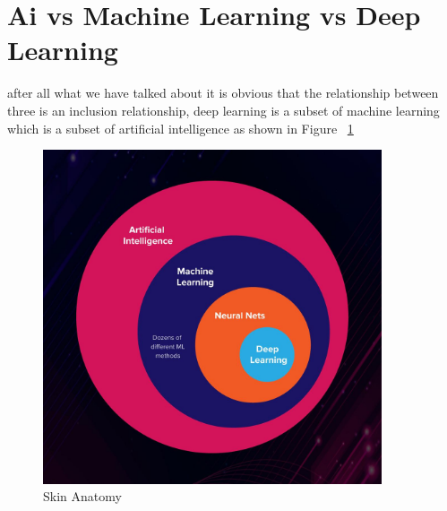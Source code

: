 \section{Ai vs Machine Learning vs Deep Learning}
    after all what we have talked about it is obvious that the relationship between three is an inclusion relationship, deep learning is a subset of machine learning which is a subset of artificial intelligence as shown in Figure ~\ref{fig:versus} 

\begin{figure}[htbp]
\begin{center}
\includegraphics[width=10cm]{./chapter-02-general-ai-information/versus.jpg}
\end{center}
\caption{Skin Anatomy ~\cite{versus}}
\label{fig:versus}
\end{figure}



